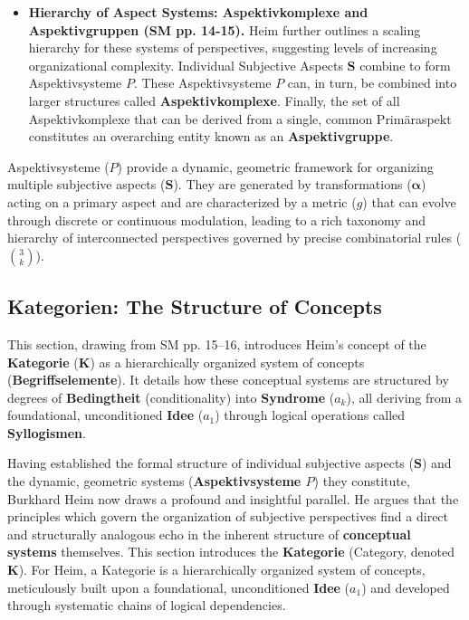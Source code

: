 \documentclass[12pt]{article}
\newcommand{\kategorie}{\bm{K}}
\newcommand{\conceptualsyndrome}{a}
\newcommand{\aspektivsystem}{P}
\begin{document}
\begin{itemize}
    \item \textbf{Hierarchy of Aspect Systems: Aspektivkomplexe and Aspektivgruppen (SM pp. 14-15).}
    Heim further outlines a scaling hierarchy for these systems of perspectives, suggesting levels of increasing organizational complexity. Individual Subjective Aspects \( \mathbf{S} \) combine to form Aspektivsysteme \( \aspektivsystem \). These Aspektivsysteme \( \aspektivsystem \) can, in turn, be combined into larger structures called \textbf{Aspektivkomplexe}. Finally, the set of all Aspektivkomplexe that can be derived from a single, common Primäraspekt constitutes an overarching entity known as an \textbf{Aspektivgruppe}.
\end{itemize}

Aspektivsysteme (\(\aspektivsystem\)) provide a dynamic, geometric framework for organizing multiple subjective aspects (\(\mathbf{S}\)). They are generated by transformations (\(\bm{\alpha}\)) acting on a primary aspect and are characterized by a metric (\(g\)) that can evolve through discrete or continuous modulation, leading to a rich taxonomy and hierarchy of interconnected perspectives governed by precise combinatorial rules (\(\binom{3}{k}\)).

\subsection{Kategorien: The Structure of Concepts}
\label{sec:kategorien}

This section, drawing from SM pp. 15--16, introduces Heim's concept of the \textbf{Kategorie} (\(\kategorie\)) as a hierarchically organized system of concepts (\textbf{Begriffselemente}). It details how these conceptual systems are structured by degrees of \textbf{Bedingtheit} (conditionality) into \textbf{Syndrome} (\(\conceptualsyndrome_k\)), all deriving from a foundational, unconditioned \textbf{Idee} (\(\conceptualsyndrome_1\)) through logical operations called \textbf{Syllogismen}.

Having established the formal structure of individual subjective aspects (\(\mathbf{S}\)) and the dynamic, geometric systems (\textbf{Aspektivsysteme \(\aspektivsystem\)}) they constitute, Burkhard Heim now draws a profound and insightful parallel. He argues that the principles which govern the organization of subjective perspectives find a direct and structurally analogous echo in the inherent structure of \textbf{conceptual systems} themselves. This section introduces the \textbf{Kategorie} (Category, denoted \(\kategorie\)). For Heim, a Kategorie is a hierarchically organized system of concepts, meticulously built upon a foundational, unconditioned \textbf{Idee} (\(\conceptualsyndrome_1\)) and developed through systematic chains of logical dependencies.
\end{document}
